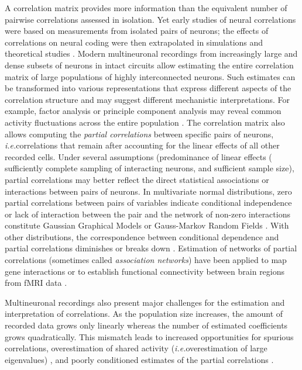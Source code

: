\documentclass[10pt]{article}
\begin{document}
A correlation matrix provides more information than the equivalent number of pairwise correlations assessed in isolation.  Yet early studies of neural correlations were based on measurements from isolated pairs of neurons; the effects of correlations on neural coding were then extrapolated in simulations and theoretical studies \cite{Shadlen:1998,Zohary:1994}.  Modern multineuronal recordings from increasingly large and dense subsets of neurons in intact circuits allow estimating the entire correlation matrix of large populations of highly interconnected neurons.  Such estimates can be transformed into various representations that express different aspects of the correlation structure and may suggest different mechanistic interpretations.  For example, factor analysis or principle component analysis may reveal common activity fluctuations across the entire population \cite{Yu:2009}.  The correlation matrix also allows computing the \emph{partial correlations} between specific pairs of neurons, \emph{i.e.}\;correlations that remain after accounting for the linear effects of all other recorded cells.  Under several assumptions (predominance of linear effects ( sufficiently complete sampling of interacting neurons, and sufficient sample size), partial correlations may better reflect the direct statistical associations or interactions between pairs of neurons. In multivariate normal distributions, zero partial correlations between pairs of variables indicate conditional independence or lack of interaction between the pair and the network of non-zero interactions constitute Gaussian Graphical Models or Gauss-Markov Random Fields \cite{Koller:2009}. With other distributions, the correspondence between conditional dependence and partial correlations diminishes or breaks down \cite{Loh:2012}. Estimation of networks of partial correlations (sometimes called \emph{association networks}) have been applied to map gene interactions \cite{Schafer:2005,Peng:2009} or to establish functional connectivity between brain regions from fMRI data \cite{Varoquaux:2012,Ryali:2012}. 

Multineuronal recordings also present major challenges for the estimation and interpretation of correlations.  As the population size increases, the amount of recorded data grows only linearly whereas the number of estimated coefficients grows quadratically.  This mismatch leads to increased opportunities for spurious correlations, overestimation of shared activity (\emph{i.e.}\;overestimation of large eigenvalues) \cite{Ledoit:2004}, and poorly conditioned estimates of the partial correlations \cite{Schafer:2005}.
\end{document}
